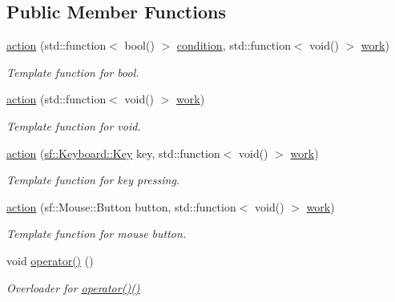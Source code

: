 \subsection*{Public Member Functions}
\begin{DoxyCompactItemize}
\item 
\hyperlink{classaction_a326b1acaf626d97dbaa9c52f6f3f90e4}{action} (std\+::function$<$ bool() $>$ \hyperlink{classaction_a949abf979a5255f54e88a6a4273afebe}{condition}, std\+::function$<$ void() $>$ \hyperlink{classaction_a1cab66c9a7adf408ebb3734e5d95315b}{work})
\begin{DoxyCompactList}\small\item\em Template function for bool. \end{DoxyCompactList}\item 
\hyperlink{classaction_af9e6424028e398ca05829d3538789840}{action} (std\+::function$<$ void() $>$ \hyperlink{classaction_a1cab66c9a7adf408ebb3734e5d95315b}{work})
\begin{DoxyCompactList}\small\item\em Template function for void. \end{DoxyCompactList}\item 
\hyperlink{classaction_ad39321beff71da26f4aef37916974f11}{action} (\hyperlink{button__actions_8hpp_a2e21a2810e34d3df6a08f9ce18ce760d}{sf\+::\+Keyboard\+::\+Key} key, std\+::function$<$ void() $>$ \hyperlink{classaction_a1cab66c9a7adf408ebb3734e5d95315b}{work})
\begin{DoxyCompactList}\small\item\em Template function for key pressing. \end{DoxyCompactList}\item 
\hyperlink{classaction_a55a91caa9803002fa7ddd6e9e9e46dc6}{action} (sf\+::\+Mouse\+::\+Button button, std\+::function$<$ void() $>$ \hyperlink{classaction_a1cab66c9a7adf408ebb3734e5d95315b}{work})
\begin{DoxyCompactList}\small\item\em Template function for mouse button. \end{DoxyCompactList}\item 
void \hyperlink{classaction_a92c003677656b5b3e6e58b19376e6b04}{operator()} ()
\begin{DoxyCompactList}\small\item\em Overloader for \hyperlink{classaction_a92c003677656b5b3e6e58b19376e6b04}{operator()()} \end{DoxyCompactList}\end{DoxyCompactItemize}
